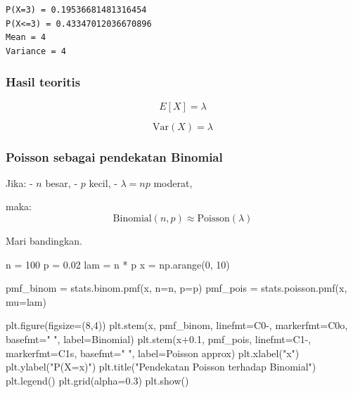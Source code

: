 \documentclass[
  letterpaper,
  DIV=11,
  numbers=noendperiod]{scrreprt}
\newenvironment{Shaded}{\begin{snugshade}}{\end{snugshade}}
\newcommand{\DecValTok}[1]{\textcolor[rgb]{0.68,0.00,0.00}{#1}}
\newcommand{\FloatTok}[1]{\textcolor[rgb]{0.68,0.00,0.00}{#1}}
\newcommand{\NormalTok}[1]{\textcolor[rgb]{0.00,0.23,0.31}{#1}}
\newcommand{\OperatorTok}[1]{\textcolor[rgb]{0.37,0.37,0.37}{#1}}
\newcommand{\StringTok}[1]{\textcolor[rgb]{0.13,0.47,0.30}{#1}}
\begin{document}
\begin{verbatim}
P(X=3) = 0.19536681481316454
P(X<=3) = 0.43347012036670896
Mean = 4
Variance = 4
\end{verbatim}

\subsubsection{Hasil teoritis}\label{hasil-teoritis-4}

\[
E[X]=\lambda
\]

\[
\mathrm{Var}(X)=\lambda
\]

\subsubsection{Poisson sebagai pendekatan
Binomial}\label{poisson-sebagai-pendekatan-binomial}

Jika: - \(n\) besar, - \(p\) kecil, - \(\lambda = np\) moderat,

maka: \[
\mathrm{Binomial}(n,p) \approx \mathrm{Poisson}(\lambda)
\]

Mari bandingkan.

\begin{Shaded}
\begin{Highlighting}[]
\NormalTok{n }\OperatorTok{=} \DecValTok{100}
\NormalTok{p }\OperatorTok{=} \FloatTok{0.02}
\NormalTok{lam }\OperatorTok{=}\NormalTok{ n }\OperatorTok{*}\NormalTok{ p}
\NormalTok{x }\OperatorTok{=}\NormalTok{ np.arange(}\DecValTok{0}\NormalTok{, }\DecValTok{10}\NormalTok{)}

\NormalTok{pmf\_binom }\OperatorTok{=}\NormalTok{ stats.binom.pmf(x, n}\OperatorTok{=}\NormalTok{n, p}\OperatorTok{=}\NormalTok{p)}
\NormalTok{pmf\_pois }\OperatorTok{=}\NormalTok{ stats.poisson.pmf(x, mu}\OperatorTok{=}\NormalTok{lam)}

\NormalTok{plt.figure(figsize}\OperatorTok{=}\NormalTok{(}\DecValTok{8}\NormalTok{,}\DecValTok{4}\NormalTok{))}
\NormalTok{plt.stem(x, pmf\_binom, linefmt}\OperatorTok{=}\StringTok{\textquotesingle{}C0{-}\textquotesingle{}}\NormalTok{, markerfmt}\OperatorTok{=}\StringTok{\textquotesingle{}C0o\textquotesingle{}}\NormalTok{, basefmt}\OperatorTok{=}\StringTok{" "}\NormalTok{, label}\OperatorTok{=}\StringTok{\textquotesingle{}Binomial\textquotesingle{}}\NormalTok{)}
\NormalTok{plt.stem(x}\OperatorTok{+}\FloatTok{0.1}\NormalTok{, pmf\_pois, linefmt}\OperatorTok{=}\StringTok{\textquotesingle{}C1{-}\textquotesingle{}}\NormalTok{, markerfmt}\OperatorTok{=}\StringTok{\textquotesingle{}C1s\textquotesingle{}}\NormalTok{, basefmt}\OperatorTok{=}\StringTok{" "}\NormalTok{, label}\OperatorTok{=}\StringTok{\textquotesingle{}Poisson approx\textquotesingle{}}\NormalTok{)}
\NormalTok{plt.xlabel(}\StringTok{"x"}\NormalTok{)}
\NormalTok{plt.ylabel(}\StringTok{"P(X=x)"}\NormalTok{)}
\NormalTok{plt.title(}\StringTok{"Pendekatan Poisson terhadap Binomial"}\NormalTok{)}
\NormalTok{plt.legend()}
\NormalTok{plt.grid(alpha}\OperatorTok{=}\FloatTok{0.3}\NormalTok{)}
\NormalTok{plt.show()}
\end{Highlighting}
\end{Shaded}
\end{document}
